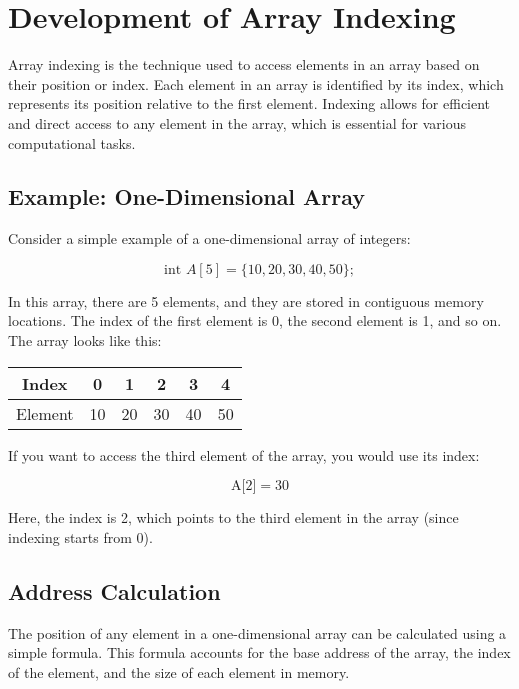 \documentclass{book}
\begin{document}
	\section{Development of Array Indexing}
	
	Array indexing is the technique used to access elements in an array based on their position or index. Each element in an array is identified by its index, which represents its position relative to the first element. Indexing allows for efficient and direct access to any element in the array, which is essential for various computational tasks.
	
	\subsection{Example: One-Dimensional Array}
	
	Consider a simple example of a one-dimensional array of integers:
	
	\[\text{int } A[5] = \{10, 20, 30, 40, 50\};\]
	
	In this array, there are 5 elements, and they are stored in contiguous memory locations. The index of the first element is 0, the second element is 1, and so on. The array looks like this:
	
	\begin{center}
    		\begin{tabular}{|c|c|c|c|c|c|}
			\hline
				Index & 0 & 1 & 2 & 3 & 4 \\
			\hline
			Element & 10 & 20 & 30 & 40 & 50 \\
			\hline
			\end{tabular}
	\end{center}
	
	If you want to access the third element of the array, you would use its index:
	
	\[\text{A[2]} = 30\]
	
	Here, the index is 2, which points to the third element in the array (since indexing starts from 0). 
		
\subsection{Address Calculation}

The position of any element in a one-dimensional array can be calculated using a simple formula. This formula accounts for the base address of the array, the index of the element, and the size of each element in memory.
\end{document}
